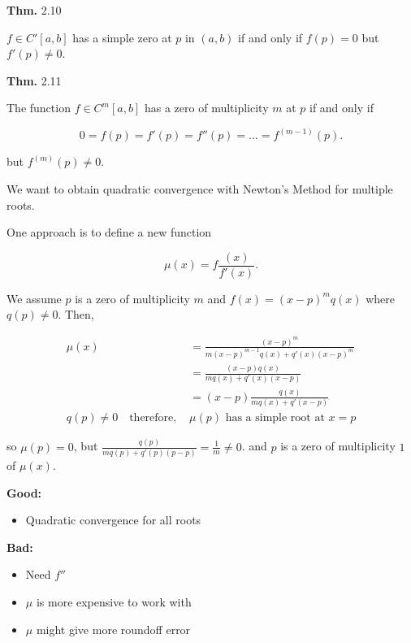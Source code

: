 \documentclass[12pt]{article}
\newcommand{\thm}{\textbf{Thm.}\xspace}
\begin{document}
\thm 2.10

$f\in C'[a,b]$ has a simple zero at $p$ in $(a,b)$ if and only if $f(p) = 0$
but $f'(p) \neq 0$.

\thm 2.11

The function $f\in C^m[a,b]$ has a zero of multiplicity $m$ at $p$ if and only
if 

\[
  0 = f(p) = f'(p) = f''(p) = \dots = f^{(m-1)}(p)
.\]

but $f^{(m)}(p) \neq 0$.

We want to obtain quadratic convergence with Newton's Method for multiple roots.

One approach is to define a new function

\[
  \mu(x) = f\frac{(x)}{f'(x)}
.\]

We assume $p$ is a zero of multiplicity $m$ and $f(x) = (x-p)^m q(x)$ where
$q(p) \neq 0$. Then,

\begin{align*}
  \mu(x) &= \frac{(x-p)^m}{m(x-p)^{m-1} q(x) + q'(x)(x-p)^m} \\
  &= \frac{(x-p)q(x)}{mq(x) + q'(x) (x-p)}  \\
  &= (x-p) \frac{q(x)}{mq(x)+q'(x-p)} \\
  q(p) \neq 0 \quad\text{therefore, } &\mu(p) \text{ has a simple root at } x=p
\end{align*}

so $\mu(p) = 0$, but $\displaystyle \frac{q(p)}{mq(p) + q'(p)(p-p)} = \frac{1}{m} \neq 0$.
and $p$ is a zero of multiplicity $1$ of $\mu(x)$.

\textbf{Good:}
\begin{itemize}
  \item Quadratic convergence for all roots
\end{itemize}

\textbf{Bad:}
\begin{itemize}
  \item Need $f''$
  \item $\mu$ is more expensive to work with
  \item $\mu$ might give more roundoff error
\end{itemize}
\end{document}
